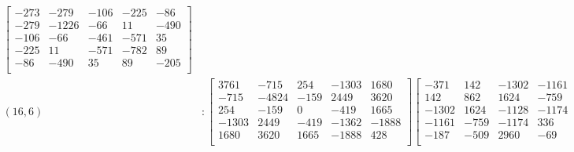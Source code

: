 \documentclass[12pt]{amsart}
\theoremstyle{plain}
\theoremstyle{definition}
\begin{document}
\begin{landscape}
\begin{align*}
\begin{bmatrix}
-273  &   -279  &   -106  &   -225  &   -86  \\ 
 -279  &   -1226  &   -66  &   11  &   -490  \\ 
 -106  &   -66  &   -461  &   -571  &   35  \\ 
 -225  &   11  &   -571  &   -782  &   89  \\ 
 -86  &   -490  &   35  &   89  &   -205  \\ 
\end{bmatrix}
\\
(16,6) &:
\begin{bmatrix}
3761  &   -715  &   254  &   -1303  &   1680  \\ 
 -715  &   -4824  &   -159  &   2449  &   3620  \\ 
 254  &   -159  &   0  &   -419  &   1665  \\ 
 -1303  &   2449  &   -419  &   -1362  &   -1888  \\ 
 1680  &   3620  &   1665  &   -1888  &   428  \\ 
\end{bmatrix}
\begin{bmatrix}
-371  &   142  &   -1302  &   -1161  &   -187  \\ 
 142  &   862  &   1624  &   -759  &   -509  \\ 
 -1302  &   1624  &   -1128  &   -1174  &   2960  \\ 
 -1161  &   -759  &   -1174  &   336  &   -69  \\ 
 -187  &   -509  &   2960  &   -69  &   -3739  \\ 
\end{bmatrix}
\begin{bmatrix}
4881  &   539  &   855  &   -1716  &   526  \\ 
 539  &   -1323  &   -107  &   -1733  &   3972  \\ 
 855  &   -107  &   427  &   -1201  &   2139  \\ 
 -1716  &   -1733  &   -1201  &   709  &   -668  \\ 
 526  &   3972  &   2139  &   -668  &   -959  \\ 
\end{bmatrix}
\begin{bmatrix}
-4995  &   -930  &   -1053  &   1599  &   -637  \\ 
 -930  &   -1526  &   -1274  &   947  &   -1235  \\ 
 -1053  &   -1274  &   -1097  &   824  &   -930  \\ 
 1599  &   947  &   824  &   -881  &   917  \\ 
 -637  &   -1235  &   -930  &   917  &   -1549  \\ 
\end{bmatrix}
\\
\end{align*} 
\end{landscape}
\end{document}
